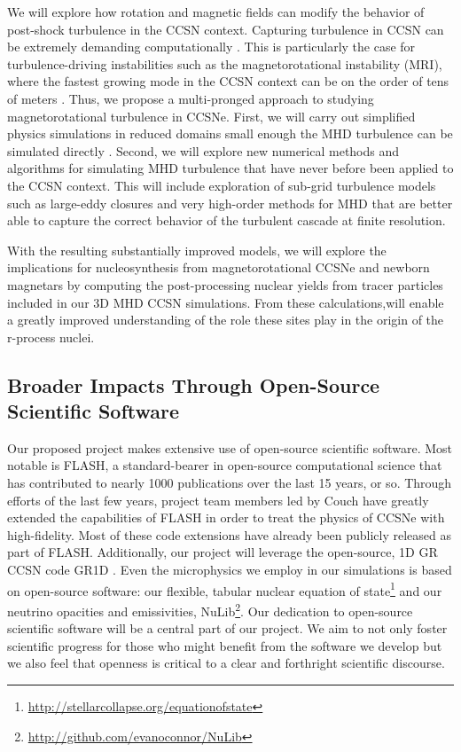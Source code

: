 We will explore how rotation and magnetic fields can modify the behavior of post-shock turbulence in the CCSN context.
Capturing turbulence in CCSN can be extremely demanding computationally \citep{Abdikamalov:2015, Couch:2015, Radice:2015, Radice:2016}.
This is particularly the case for turbulence-driving instabilities such as the magnetorotational instability (MRI), where the fastest growing mode in the CCSN context can be on the order of tens of meters \citep[c.f.,][]{Akiyama:2003, Burrows:2007, Obergaulinger:2009, Mosta:2015}.
Thus, we propose a multi-pronged approach to studying magnetorotational turbulence in CCSNe.
First, we will carry out simplified physics simulations in reduced domains small enough the MHD turbulence can be simulated directly \citep[e.g.,][]{Obergaulinger:2009, Mosta:2015}.
Second, we will explore new numerical methods and algorithms for simulating MHD turbulence that have never before been applied to the CCSN context.
This will include exploration of sub-grid turbulence models such as large-eddy closures \citep{Pope:2000} and very high-order methods for MHD \citep{Rembiasz:2016} that are better able to capture the correct behavior of the turbulent cascade at finite resolution.

With the resulting substantially improved models, we will explore the implications for nucleosynthesis from magnetorotational CCSNe and newborn magnetars by computing the post-processing nuclear yields from tracer particles included in our 3D MHD CCSN simulations. From these calculations,will enable a greatly improved understanding of the role these sites play in the origin of the r-process nuclei.



\subsection{Broader Impacts Through Open-Source Scientific Software}

Our proposed project makes extensive use of open-source scientific software.
Most notable is FLASH, a standard-bearer in open-source computational science that has contributed to nearly 1000 publications over the last 15 years, or so.
Through efforts of the last few years, project team members led by Couch have greatly extended the capabilities of FLASH in order to treat the physics of CCSNe with high-fidelity.
Most of these code extensions have already been publicly released as part of FLASH.
Additionally, our project will leverage the open-source, 1D GR CCSN code GR1D \citep{OConnor:2010, OConnor:2013, OConnor:2015}.
Even the microphysics we employ in our simulations is based on open-source software: our flexible, tabular nuclear equation of state\footnote{\url{http://stellarcollapse.org/equationofstate}} and our neutrino opacities and emissivities, NuLib\footnote{\url{http://github.com/evanoconnor/NuLib}}.
Our dedication to open-source scientific software will be a central part of our project.
We aim to not only foster scientific progress for those who might benefit from the software we develop but we also feel that openness is critical to a clear and forthright scientific discourse.



